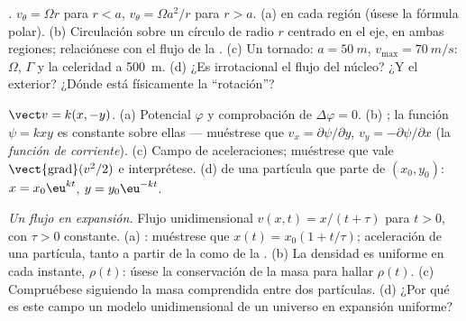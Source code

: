 \begin{exercise}[$\star\star$]\label{exo:b2:fluid-kinematics:8}
\emph{.} $v_\theta = \Omega r$ para $r < a$, $v_\theta = \Omega a^2/r$
para $r > a$. (a)  en cada región (úsese la fórmula polar). (b)
Circulación sobre un círculo de radio $r$ centrado en el eje, en ambas
regiones; relaciónese con el flujo de la . (c) Un tornado: $a = \qty{50}{m}$,
$v_{\max} = \qty{70}{m/s}$: $\Omega$, $\Gamma$ y la celeridad a \qty{500}{m}.
(d) ¿Es irrotacional el flujo del núcleo? ¿Y el exterior? ¿Dónde está
físicamente la ``rotación''?
\end{exercise}

\begin{exercise}[$\star\star$]\label{exo:b2:fluid-kinematics:9}
\emph{} $\vect v = k(x, -y)$. (a) Potencial $\varphi$ y
comprobación de $\Delta\varphi = 0$. (b) ; la función $\psi = kxy$ es
constante sobre ellas --- muéstrese que $v_x = \partial\psi/\partial y$, $v_y = -\partial\psi/
\partial x$ (la \emph{función de corriente}). (c) Campo de aceleraciones;
muéstrese que vale $\operatorname{\vect{grad}}(v^2/2)$ e interprétese. (d)  de una
partícula que parte de $(x_0, y_0)$: $x = x_0\eu^{kt}$, $y = y_0\eu^{-kt}$.
\end{exercise}

\begin{exercise}[$\star\star\star$]\label{exo:b2:fluid-kinematics:10}
\emph{Un flujo en expansión.} Flujo unidimensional $v(x, t) = x/(t + \tau)$
para $t > 0$, con $\tau > 0$ constante. (a) : muéstrese que $x(t) = x_0(1 +
t/\tau)$; aceleración de una partícula, tanto a partir de la 
como de la . (b) La densidad es uniforme en cada instante,
$\rho(t)$: úsese la conservación de la masa para hallar $\rho(t)$. (c)
Compruébese siguiendo la masa comprendida entre dos partículas. (d) ¿Por
qué es este campo un modelo unidimensional de un universo en expansión uniforme?
\end{exercise}

